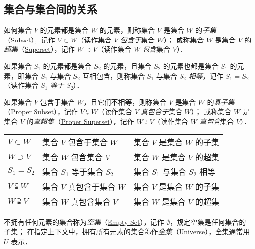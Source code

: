 \subsection{集合与集合间的关系}
%
如何集合 $V$ 的元素都是集合 $W$ 的元素，则称集合 $V$ 是集合 $W$ 的\emph{子集}（\href{http://mathworld.wolfram.com/Subset.html}{Subset}），记作 $V\subset{}W$（读作集合 $V$ \emph{包含于}集合 $W$）；
或称集合 $W$ 是集合 $V$ 的\emph{超集}（\href{http://mathworld.wolfram.com/Superset.html}{Superset}），记作 $W\supset{}V$（读作集合 $W$ \emph{包含}集合 $V$）．

如果集合 $S_1$ 的元素都是集合 $S_2$ 的元素，且集合 $S_2$ 的元素也都是集合 $S_1$ 的元素，即集合 $S_1$ 与集合 $S_2$ 互相包含，则称集合 $S_1$ 与集合 $S_2$ \emph{相等}，记作 $S_1=S_2$（读作集合 $S_1$ \emph{等于} $S_2$）．

如果集合 $V$ 包含于集合 $W$，且它们不相等，则称集合 $V$ 是集合 $W$ 的\emph{真子集}（\href{http://mathworld.wolfram.com/ProperSubset.html}{Proper Subset}），记作 $V\subsetneqq{}W$（读作集合 $V$ \emph{真包含于}集合 $W$）；
或称集合 $W$ 是集合 $V$ 的\emph{真超集}（\href{http://mathworld.wolfram.com/ProperSuperset.html}{Proper Superset}），记作 $W\supsetneqq{}V$（读作集合 $W$ \emph{真包含}集合 $V$）．

\begin{table}[h]
	\centering
	\begin{tabular}{l l l}
		\hline
		$V\subset{}W$     & 集合 $V$ 包含于集合 $W$   & 集合 $V$ 是集合 $W$ 的子集   \\
		$W\supset{}V$     & 集合 $W$ 包含集合 $V$     & 集合 $W$ 是集合 $V$ 的超集   \\
		$S_1=S_2$         & 集合 $S_1$ 等于集合 $S_2$ & 集合 $S_1$ 与集合 $S_2$ 相等 \\
		$V\subsetneqq{}W$ & 集合 $V$ 真包含于集合 $W$ & 集合 $V$ 是集合 $W$ 的子集   \\
		$W\supsetneqq{}V$ & 集合 $W$ 真包含集合 $V$   & 集合 $W$ 是集合 $V$ 的超集   \\
		\hline
	\end{tabular}
\end{table}

不拥有任何元素的集合称为\emph{空集}（\href{http://mathworld.wolfram.com/EmptySet.html}{Empty Set}），记作 $\emptyset$，规定空集是任何集合的子集；
在指定上下文中，拥有所有元素的集合称作\emph{全集}（\href{http://mathworld.wolfram.com/UniversalSet.html}{Universe}），全集通常用 $U$ 表示．
%

